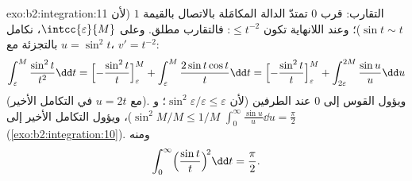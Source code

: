 \begin{solution}{exo:b2:integration:11}
التقارب: قرب $0$ تمتدّ الدالة المكامَلة بالاتصال بالقيمة
$1$ (لأن $\sin t \sim t$)؛ وعند اللانهاية تكون $\leq t^{-2}$:
فالتقارب مطلق. وعلى $\intcc{\varepsilon}{M}$، نكامل
بالتجزئة مع $u = \sin^2 t$، $v' = t^{-2}$:
\[
\int_\varepsilon^M \frac{\sin^2 t}{t^2}\dd t
= \Bigl[-\frac{\sin^2 t}{t}\Bigr]_\varepsilon^M
+ \int_\varepsilon^M \frac{2\sin t\cos t}{t}\dd t
= \Bigl[-\frac{\sin^2 t}{t}\Bigr]_\varepsilon^M
+ \int_{2\varepsilon}^{2M} \frac{\sin u}{u}\dd u
\]
(مع $u = 2t$ في التكامل الأخير). ويؤول القوس إلى $0$ عند
الطرفين (لأن $\sin^2\varepsilon/\varepsilon \leq \varepsilon$؛ و
$\sin^2 M/M \leq 1/M$)، ويؤول التكامل الأخير إلى
$\int_0^\infty \frac{\sin u}{u}\dd u = \frac\pi2$
(\cref{exo:b2:integration:10}). ومنه
\[
\int_0^\infty \Bigl(\frac{\sin t}{t}\Bigr)^{\!2}\dd t
= \frac\pi2 .
\]
\end{solution}

